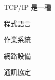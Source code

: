 \ifx\ntpcNinetyTwo\undefined[92學年基北區] \fi
TCP/IP 是一種
  \begin{optionlist}
  \item 程式語言
  \item 作業系統
  \item 網路設備
  \item 通訊協定\label{ntpc-92-a45}
  \end{optionlist}